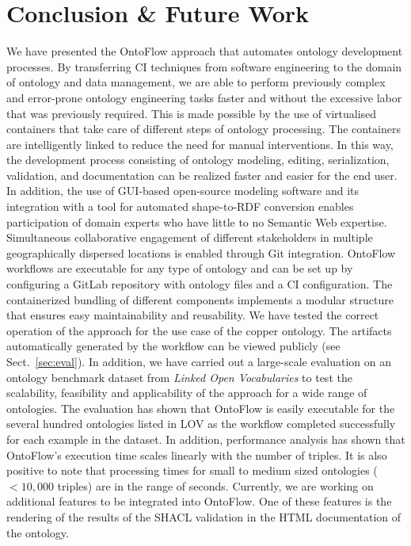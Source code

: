 \documentclass[runningheads]{llncs}
\begin{document}
\section{Conclusion \& Future Work}\label{sec:final}
We have presented the OntoFlow approach that automates ontology development processes. By transferring CI techniques from software engineering to the domain of ontology and data management, we are able to perform previously complex and error-prone ontology engineering tasks faster and without the excessive labor that was previously required. This is made possible by the use of virtualised containers that take care of different steps of ontology processing. The containers are intelligently linked to reduce the need for manual interventions. In this way, the development process consisting of ontology modeling, editing, serialization, validation, and documentation can be realized faster and easier for the end user. In addition, the use of GUI-based open-source modeling software and its integration with a tool for automated shape-to-RDF conversion enables participation of domain experts who have little to no Semantic Web expertise. Simultaneous collaborative engagement of different stakeholders in multiple geographically dispersed locations is enabled through Git integration. OntoFlow workflows are executable for any type of ontology and can be set up by configuring a GitLab repository with ontology files and a CI configuration. The containerized bundling of different components implements a modular structure that ensures easy maintainability and reusability. We have tested the correct operation of the approach for the use case of the copper ontology. The artifacts automatically generated by the workflow can be viewed publicly (see Sect.~\ref{sec:eval}). In addition, we have carried out a large-scale evaluation on an ontology benchmark dataset from \textit{Linked Open Vocabularies} to test the scalability, feasibility and applicability of the approach for a wide range of ontologies. The evaluation has shown that OntoFlow is easily executable for the several hundred ontologies listed in LOV as the workflow completed successfully for each example in the dataset. In addition, performance analysis has shown that OntoFlow's execution time scales linearly with the number of triples. It is also positive to note that processing times for small to medium sized ontologies ($< 10,000$ triples) are in the range of seconds. Currently, we are working on additional features to be integrated into OntoFlow. One of these features is the rendering of the results of the SHACL validation in the HTML documentation of the ontology.
\end{document}
